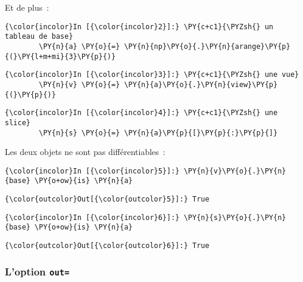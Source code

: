     Et de plus~:

    \begin{Verbatim}[commandchars=\\\{\}]
{\color{incolor}In [{\color{incolor}2}]:} \PY{c+c1}{\PYZsh{} un tableau de base}
        \PY{n}{a} \PY{o}{=} \PY{n}{np}\PY{o}{.}\PY{n}{arange}\PY{p}{(}\PY{l+m+mi}{3}\PY{p}{)}
\end{Verbatim}


    \begin{Verbatim}[commandchars=\\\{\}]
{\color{incolor}In [{\color{incolor}3}]:} \PY{c+c1}{\PYZsh{} une vue}
        \PY{n}{v} \PY{o}{=} \PY{n}{a}\PY{o}{.}\PY{n}{view}\PY{p}{(}\PY{p}{)}
\end{Verbatim}


    \begin{Verbatim}[commandchars=\\\{\}]
{\color{incolor}In [{\color{incolor}4}]:} \PY{c+c1}{\PYZsh{} une slice}
        \PY{n}{s} \PY{o}{=} \PY{n}{a}\PY{p}{[}\PY{p}{:}\PY{p}{]}
\end{Verbatim}


    Les deux objets ne sont pas différentiables~:

    \begin{Verbatim}[commandchars=\\\{\}]
{\color{incolor}In [{\color{incolor}5}]:} \PY{n}{v}\PY{o}{.}\PY{n}{base} \PY{o+ow}{is} \PY{n}{a}
\end{Verbatim}


\begin{Verbatim}[commandchars=\\\{\}]
{\color{outcolor}Out[{\color{outcolor}5}]:} True
\end{Verbatim}
            
    \begin{Verbatim}[commandchars=\\\{\}]
{\color{incolor}In [{\color{incolor}6}]:} \PY{n}{s}\PY{o}{.}\PY{n}{base} \PY{o+ow}{is} \PY{n}{a}
\end{Verbatim}


\begin{Verbatim}[commandchars=\\\{\}]
{\color{outcolor}Out[{\color{outcolor}6}]:} True
\end{Verbatim}
            
    \hypertarget{loption-out}{%
\subsubsection{\texorpdfstring{L'option
\texttt{out=}}{L'option out=}}\label{loption-out}}

